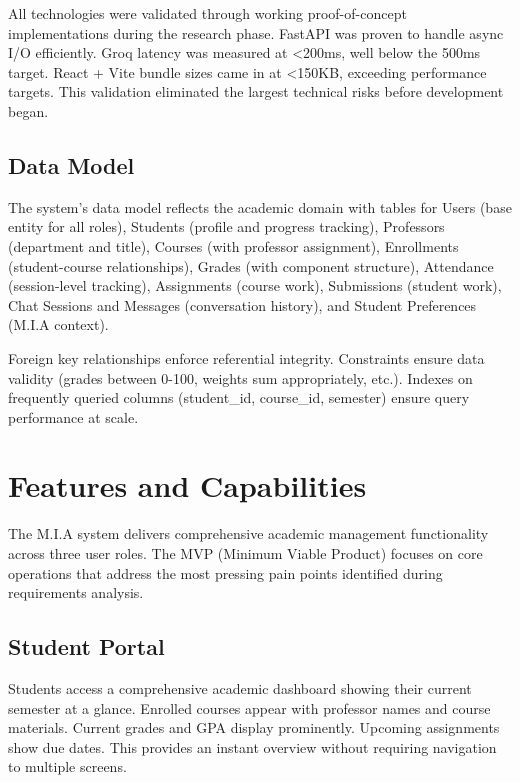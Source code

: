 \documentclass[12pt,a4paper]{report}
\begin{document}
All technologies were validated through working proof-of-concept implementations during the research phase. FastAPI was proven to handle async I/O efficiently. Groq latency was measured at <200ms, well below the 500ms target. React + Vite bundle sizes came in at <150KB, exceeding performance targets. This validation eliminated the largest technical risks before development began.

\section{Data Model}

The system's data model reflects the academic domain with tables for Users (base entity for all roles), Students (profile and progress tracking), Professors (department and title), Courses (with professor assignment), Enrollments (student-course relationships), Grades (with component structure), Attendance (session-level tracking), Assignments (course work), Submissions (student work), Chat Sessions and Messages (conversation history), and Student Preferences (M.I.A context).

Foreign key relationships enforce referential integrity. Constraints ensure data validity (grades between 0-100, weights sum appropriately, etc.). Indexes on frequently queried columns (student_id, course_id, semester) ensure query performance at scale.

\chapter{Features and Capabilities}

The M.I.A system delivers comprehensive academic management functionality across three user roles. The MVP (Minimum Viable Product) focuses on core operations that address the most pressing pain points identified during requirements analysis.

\section{Student Portal}

Students access a comprehensive academic dashboard showing their current semester at a glance. Enrolled courses appear with professor names and course materials. Current grades and GPA display prominently. Upcoming assignments show due dates. This provides an instant overview without requiring navigation to multiple screens.
\end{document}
